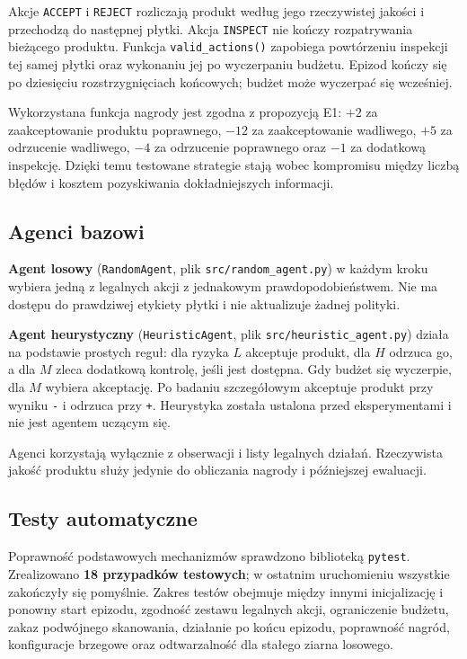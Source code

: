 \documentclass[12pt]{article}
\begin{document}
Akcje \texttt{ACCEPT} i \texttt{REJECT} rozliczają produkt według jego rzeczywistej jakości i przechodzą do następnej płytki. Akcja \texttt{INSPECT} nie kończy rozpatrywania bieżącego produktu. Funkcja \texttt{valid\_actions()} zapobiega powtórzeniu inspekcji tej samej płytki oraz wykonaniu jej po wyczerpaniu budżetu. Epizod kończy się po dziesięciu rozstrzygnięciach końcowych; budżet może wyczerpać się wcześniej.

Wykorzystana funkcja nagrody jest zgodna z propozycją E1: \(+2\) za zaakceptowanie produktu poprawnego, \(-12\) za zaakceptowanie wadliwego, \(+5\) za odrzucenie wadliwego, \(-4\) za odrzucenie poprawnego oraz \(-1\) za dodatkową inspekcję. Dzięki temu testowane strategie stają wobec kompromisu między liczbą błędów i kosztem pozyskiwania dokładniejszych informacji.

\subsection{Agenci bazowi}

\textbf{Agent losowy} (\texttt{RandomAgent}, plik \texttt{src/random\_agent.py}) w każdym kroku wybiera jedną z legalnych akcji z jednakowym prawdopodobieństwem. Nie ma dostępu do prawdziwej etykiety płytki i nie aktualizuje żadnej polityki.

\textbf{Agent heurystyczny} (\texttt{HeuristicAgent}, plik \texttt{src/heuristic\_agent.py}) działa na podstawie prostych reguł: dla ryzyka \(L\) akceptuje produkt, dla \(H\) odrzuca go, a dla \(M\) zleca dodatkową kontrolę, jeśli jest dostępna. Gdy budżet się wyczerpie, dla \(M\) wybiera akceptację. Po badaniu szczegółowym akceptuje produkt przy wyniku \texttt{-} i odrzuca przy \texttt{+}. Heurystyka została ustalona przed eksperymentami i nie jest agentem uczącym się.

Agenci korzystają wyłącznie z obserwacji i listy legalnych działań. Rzeczywista jakość produktu służy jedynie do obliczania nagrody i późniejszej ewaluacji.

\subsection{Testy automatyczne}

Poprawność podstawowych mechanizmów sprawdzono biblioteką \texttt{pytest}. Zrealizowano \textbf{18 przypadków testowych}; w ostatnim uruchomieniu wszystkie zakończyły się pomyślnie. Zakres testów obejmuje między innymi inicjalizację i ponowny start epizodu, zgodność zestawu legalnych akcji, ograniczenie budżetu, zakaz podwójnego skanowania, działanie po końcu epizodu, poprawność nagród, konfiguracje brzegowe oraz odtwarzalność dla stałego ziarna losowego.
\end{document}
